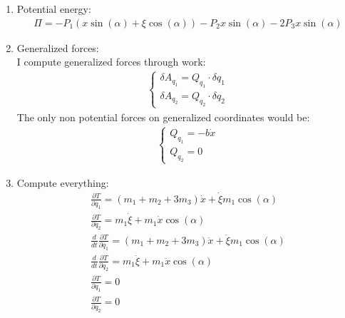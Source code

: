 \begin{enumerate}
\begin{enumerate}
              \item Potential energy:
                    \begin{align}
                        \Pi = -P_1 (x \sin(\alpha) + \xi \cos(\alpha)) - P_2 x \sin(\alpha) - 2 P_{3} x \sin(\alpha)
                    \end{align}
              \item Generalized forces: \\
                    I compute generalized forces through work:
                    \begin{align}
                        \begin{cases}
                            \delta A_{q_1} = Q_{q_1} \cdot \delta q_1 \\
                            \delta A_{q_2} = Q_{q_2} \cdot \delta q_2
                        \end{cases}
                    \end{align}
                    The only non potential forces on generalized coordinates would be:
                    \begin{align}
                        \begin{cases}
                            Q_{q_1} = -b \dot{x} \\
                            Q_{q_2} = 0
                        \end{cases}
                    \end{align}
              \item Compute everything:
                    \begin{align}
                        \frac{\partial T}{\partial \dot{q_1}} = (m_1 + m_2 + 3 m_3) \dot{x} + \dot{\xi} m_1 \cos(\alpha)                \\
                        \frac{\partial T}{\partial \dot{q_2}} = m_1 \dot{\xi} + m_1 \dot{x} \cos(\alpha)                                \\
                        \frac{d}{dt} \frac{\partial T}{\partial \dot{q_1}} = (m_1 + m_2 + 3 m_3) \ddot{x} + \ddot{\xi} m_1 \cos(\alpha) \\
                        \frac{d}{dt} \frac{\partial T}{\partial \dot{q_2}} = m_1 \ddot{\xi} + m_1 \ddot{x} \cos(\alpha)                 \\
                        \frac{\partial T}{\partial q_1} = 0                                                                             \\
                        \frac{\partial T}{\partial q_2} = 0                                                                             \\

\end{align}
\end{enumerate}
\end{enumerate}
